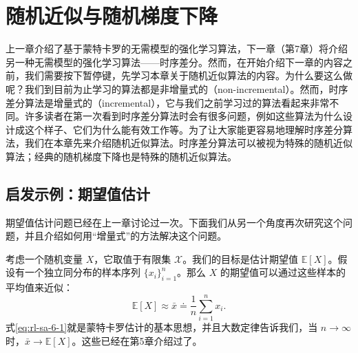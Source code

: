 \chapter{随机近似与随机梯度下降}
\label{ch:rl-sa}



上一章介绍了基于蒙特卡罗的无需模型的强化学习算法，下一章（第7章）将介绍另一种无需模型的强化学习算法——时序差分。然而，在开始介绍下一章的内容之前，我们需要按下暂停键，先学习本章关于随机近似算法的内容。为什么要这么做呢？我们到目前为止学习的算法都是非增量式的（non-incremental）。然而，时序差分算法是增量式的（incremental），它与我们之前学习过的算法看起来非常不同。许多读者在第一次看到时序差分算法时会有很多问题，例如这些算法为什么设计成这个样子、它们为什么能有效工作等。为了让大家能更容易地理解时序差分算法，我们在本章先来介绍随机近似算法。时序差分算法可以被视为特殊的随机近似算法；经典的随机梯度下降也是特殊的随机近似算法。

\section{启发示例：期望值估计}
\label{sec:rl-sa-mean}

期望值估计问题已经在上一章讨论过一次。下面我们从另一个角度再次研究这个问题，并且介绍如何用“增量式”的方法解决这个问题。

考虑一个随机变量 $X$，它取值于有限集 $\mathcal{X}$。我们的目标是估计期望值 $\mathbb{E}[X]$。假设有一个独立同分布的样本序列 $\{x_i\}_{i=1}^n$。那么 $X$ 的期望值可以通过这些样本的平均值来近似：
\begin{equation}
\mathbb{E}[X] \approx \bar{x} \doteq \frac{1}{n} \sum_{i=1}^{n} x_i.
\label{eq:rl-sa-6-1}
\end{equation}
式\eqref{eq:rl-sa-6-1}就是蒙特卡罗估计的基本思想，并且大数定律告诉我们，当 $n\to\infty$ 时，$\bar{x}\to \mathbb{E}[X]$。这些已经在第5章介绍过了。

